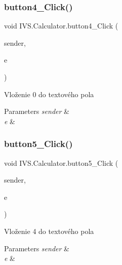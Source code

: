 \subsubsection{\texorpdfstring{button4\+\_\+\+Click()}{button4\_Click()}}
{\footnotesize\ttfamily void I\+V\+S.\+Calculator.\+button4\+\_\+\+Click (\begin{DoxyParamCaption}\item[{object}]{sender,  }\item[{Event\+Args}]{e }\end{DoxyParamCaption})\hspace{0.3cm}{\ttfamily [protected]}}



Vloženie \textquotesingle{}0\textquotesingle{} do textového pola 


\begin{DoxyParams}{Parameters}
{\em sender} & \\
\hline
{\em e} & \\
\hline
\end{DoxyParams}
\mbox{\label{class_i_v_s_1_1_calculator_a7ea090e719a196447aadfd4a065a42f0}} 
\subsubsection{\texorpdfstring{button5\+\_\+\+Click()}{button5\_Click()}}
{\footnotesize\ttfamily void I\+V\+S.\+Calculator.\+button5\+\_\+\+Click (\begin{DoxyParamCaption}\item[{object}]{sender,  }\item[{Event\+Args}]{e }\end{DoxyParamCaption})\hspace{0.3cm}{\ttfamily [protected]}}



Vloženie \textquotesingle{}4\textquotesingle{} do textového pola 


\begin{DoxyParams}{Parameters}
{\em sender} & \\
\hline
{\em e} & \\
\hline
\end{DoxyParams}
\mbox{\label{class_i_v_s_1_1_calculator_a061c919ebdc08c877ae00f4ce1697739}} 
